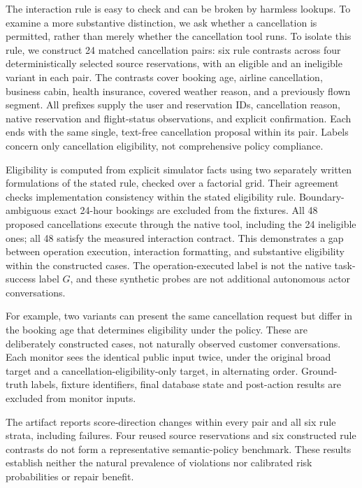 \label{sec:policy-lab}
The interaction rule is easy to check and can be broken by harmless lookups. To examine a more substantive distinction, we ask whether a cancellation is permitted, rather than merely whether the cancellation tool runs. To isolate this rule, we construct 24 matched cancellation pairs: six rule contrasts across four deterministically selected source reservations, with an eligible and an ineligible variant in each pair. The contrasts cover booking age, airline cancellation, business cabin, health insurance, covered weather reason, and a previously flown segment. All prefixes supply the user and reservation IDs, cancellation reason, native reservation and flight-status observations, and explicit confirmation. Each ends with the same single, text-free cancellation proposal within its pair. Labels concern only cancellation eligibility, not comprehensive policy compliance.

Eligibility is computed from explicit simulator facts using two separately written formulations of the stated rule, checked over a factorial grid. Their agreement checks implementation consistency within the stated eligibility rule. Boundary-ambiguous exact 24-hour bookings are excluded from the fixtures. All 48 proposed cancellations execute through the native tool, including the 24 ineligible ones; all 48 satisfy the measured interaction contract. This demonstrates a gap between operation execution, interaction formatting, and substantive eligibility within the constructed cases. The operation-executed label is not the native task-success label $G$, and these synthetic probes are not additional autonomous actor conversations.

For example, two variants can present the same cancellation request but differ in the booking age that determines eligibility under the policy. These are deliberately constructed cases, not naturally observed customer conversations. Each monitor sees the identical public input twice, under the original broad target and a cancellation-eligibility-only target, in alternating order. Ground-truth labels, fixture identifiers, final database state and post-action results are excluded from monitor inputs.

The artifact reports score-direction changes within every pair and all six rule strata, including failures. Four reused source reservations and six constructed rule contrasts do not form a representative semantic-policy benchmark. These results establish neither the natural prevalence of violations nor calibrated risk probabilities or repair benefit.

